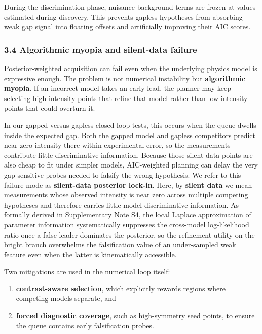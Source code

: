 \documentclass[
]{article}
\providecommand{\tightlist}{%
  \setlength{\itemsep}{0pt}\setlength{\parskip}{0pt}}
\begin{document}
During the discrimination phase, nuisance background terms are frozen at
values estimated during discovery. This prevents gapless hypotheses from
absorbing weak gap signal into floating offsets and artificially
improving their AIC scores.

\hypertarget{algorithmic-myopia-and-silent-data-failure}{%
\subsubsection{3.4 Algorithmic myopia and silent-data
failure}\label{algorithmic-myopia-and-silent-data-failure}}

Posterior-weighted acquisition can fail even when the underlying physics
model is expressive enough. The problem is not numerical instability but
\textbf{algorithmic myopia}. If an incorrect model takes an early lead,
the planner may keep selecting high-intensity points that refine that
model rather than low-intensity points that could overturn it.

In our gapped-versus-gapless closed-loop tests, this occurs when the
queue dwells inside the expected gap. Both the gapped model and gapless
competitors predict near-zero intensity there within experimental error,
so the measurements contribute little discriminative information.
Because those silent data points are also cheap to fit under simpler
models, AIC-weighted planning can delay the very gap-sensitive probes
needed to falsify the wrong hypothesis. We refer to this failure mode as
\textbf{silent-data posterior lock-in}. Here, by \textbf{silent data} we
mean measurements whose observed intensity is near zero across multiple
competing hypotheses and therefore carries little model-discriminative
information. As formally derived in Supplementary Note S4, the local
Laplace approximation of parameter information systematically suppresses
the cross-model log-likelihood ratio once a false leader dominates the
posterior, so the refinement utility on the bright branch overwhelms the
falsification value of an under-sampled weak feature even when the
latter is kinematically accessible.

Two mitigations are used in the numerical loop itself:

\begin{enumerate}
\def\labelenumi{\arabic{enumi}.}
\tightlist
\item
  \textbf{contrast-aware selection}, which explicitly rewards regions
  where competing models separate, and\\
\item
  \textbf{forced diagnostic coverage}, such as high-symmetry seed
  points, to ensure the queue contains early falsification probes.
\end{enumerate}
\end{document}
